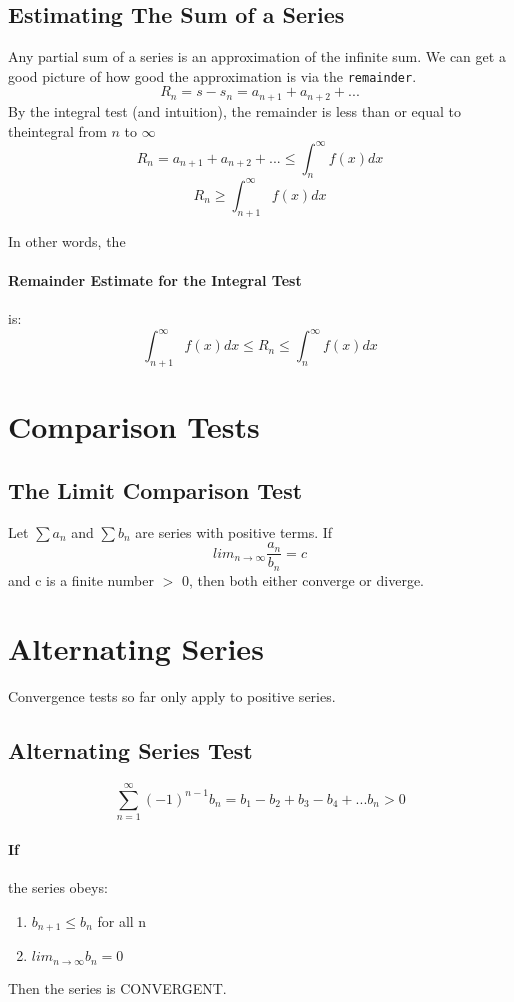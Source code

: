 \documentclass[a4paper,12pt]{report}
\begin{document}
\subsection{Estimating The Sum of a Series}
Any partial sum of a series is an approximation of the infinite sum. We can get a good picture of how good the approximation is via the \texttt{remainder}.
$$R_n = s - s_n = a_{n+1} + a_{n+2} + ...$$
By the integral test (and intuition), the remainder is less than or equal to theintegral from $n$ to $\infty$
$$R_n = a_{n+1} + a_{n+2} + ... \leq \int_n^{\infty}f(x)dx$$
$$R_n \geq \int_{n+1}^{\infty}f(x)dx$$

In other words, the \paragraph{Remainder Estimate for the Integral Test} is:
$$ \int_{n+1}^{\infty}f(x) dx \leq R_n \leq \int_n^{\infty}f(x) dx$$

\section{Comparison Tests}
\subsection{The Limit Comparison Test}
Let $\sum a_n$ and $\sum b_n$ are series with positive terms. If $$lim_{n \to \infty} \frac{a_n}{b_n} = c$$ and c is a finite number $>$ 0, then both either converge or diverge.

\section{Alternating Series}
Convergence tests so far only apply to positive series. 
\subsection{Alternating Series Test}
$$\sum_{n=1}^{\infty} (-1)^{n-1} b_n = b_1 - b_2 + b_3 - b_4 + ... b_n > 0$$
\paragraph{If } the series obeys:
\begin{enumerate}
\item $b_{n+1} \leq b_n$ for all n
\item $lim_{n \to \infty} b_n = 0$
\end{enumerate}
Then the series is CONVERGENT.
\end{document}
